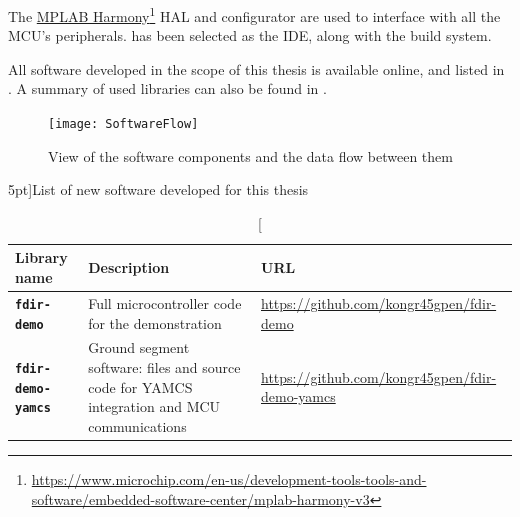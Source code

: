\documentclass[a4paper,nobib]{tufte-book}
\begin{document}
The \href{https://www.microchip.com/en-us/development-tools-tools-and-software/embedded-software-center/mplab-harmony-v3}{MPLAB Harmony}\footnote[][1.5cm]{\url{https://www.microchip.com/en-us/development-tools-tools-and-software/embedded-software-center/mplab-harmony-v3}} \ac{HAL} and configurator are used to interface with all the \acs{MCU}'s peripherals.  has been selected as the \acs{IDE}, along with the  build system.

All software developed in the scope of this thesis is available online, and listed in . A summary of used libraries can also be found in .

\begin{figure}[h]
	\vspace{1cm}
	\texttt{[image: SoftwareFlow]}
	\caption{View of the software components and the data flow between them}
	\label{sec:softwareflow}
\end{figure}

\FloatBarrier
\begin{table}[h]
	\centering
	\caption[][5pt]{List of new software developed for this thesis}
	\renewcommand{\arraystretch}{1.2}
	\label{tab:new_software}
	\begin{tabularx}{\textwidth}{@{}lXp{6cm}@{}}
		\toprule
		Library name & Description & URL \\ \midrule
		\textbf{\texttt{fdir-demo}} & Full microcontroller code for the demonstration & \small \url{https://github.com/kongr45gpen/fdir-demo} \\
		\textbf{\texttt{fdir-demo-yamcs}} & Ground segment software: files and source code for \acs{YAMCS} integration and \acs{MCU} communications & \small \url{https://github.com/kongr45gpen/fdir-demo-yamcs} \\
		\bottomrule
	\end{tabularx}
\end{table}
\end{document}
